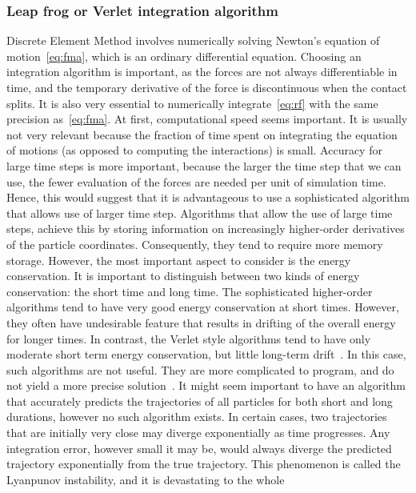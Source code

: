 \subsubsection{Leap frog or Verlet integration algorithm}
Discrete Element Method involves numerically solving Newton's equation of 
motion~\cref{eq:fma}, 
which 
is an ordinary differential equation. Choosing an integration algorithm is 
important, as the 
forces 
are not always differentiable in time, and the temporary derivative of the 
force is discontinuous 
when the contact splits. It is also very essential to numerically 
integrate~\cref{eq:rf} with 
the same precision as~\cref{eq:fma}. At first, computational speed seems 
important. It is 
usually not very relevant because the fraction of time spent on integrating 
the equation of 
motions 
(as opposed to computing the interactions) is small. Accuracy for large time 
steps is more 
important, because the larger the time step that we can use, the fewer 
evaluation of the forces 
are 
needed per unit of simulation time. Hence, this would suggest that it is 
advantageous to use a 
sophisticated algorithm that allows use of larger time step. Algorithms that 
allow the use of 
large 
time steps, achieve this by storing information on increasingly higher-order 
derivatives of the 
particle coordinates. Consequently, they tend to require more memory storage. 
However, the most 
important aspect to consider is the energy conservation. It is important to 
distinguish between 
two 
kinds of energy conservation: the short time and long time. The sophisticated 
higher-order 
algorithms tend to have very good energy conservation at short times. However, 
they often have 
undesirable feature that results in drifting of the overall energy for longer 
times. In contrast, 
the Verlet style algorithms tend to have only moderate short term energy 
conservation, but little 
long-term drift~\citep{Daan1996}. In this case, such algorithms are not 
useful. They are more 
complicated to program, and do not yield a more precise 
solution~\citep{Sean2011}. It might seem 
important to have an algorithm that accurately predicts the trajectories of 
all particles for both 
short and long durations, however no such algorithm exists. In certain cases, 
two trajectories 
that 
are initially very close may diverge exponentially as time progresses. Any 
integration error, 
however small it may be, would always diverge the predicted trajectory 
exponentially from the true 
trajectory. This phenomenon is called the Lyanpunov instability, and it is 
devastating to the 
whole 
